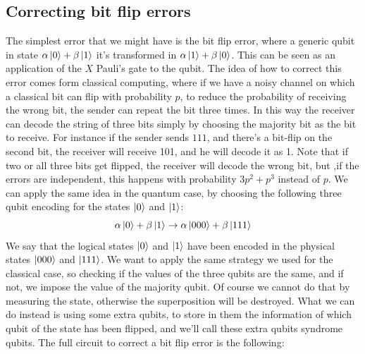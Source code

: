 \documentclass{article}
\begin{document}
	\subsection{Correcting bit flip errors}
	The simplest error that we might have is the bit flip error, where a generic qubit in state $\alpha\ket{0} + \beta\ket{1}$ it's transformed in $\alpha\ket{1} + \beta\ket{0}$. This can be seen as an application of the $X$ Pauli's gate to the qubit. The idea of how to correct this error comes form classical computing, where if we have a noisy channel on which a classical bit can flip with probability $p$, to reduce the probability of receiving the wrong bit, the sender can repeat the bit three times. In this way the receiver can decode the string of three bits simply by choosing the majority bit as the bit to receive. For instance if the sender sends $111$, and there's a bit-flip on the second bit, the receiver will receive 101, and he will decode it as 1. Note that if two or all three bits get flipped, the receiver will decode the wrong bit, but ,if the errors are independent, this happens with probability $3p^2 + p^3$ instead of $p$. We can apply the same idea in the quantum case, by choosing the following three qubit encoding for the states $\ket{0}$ and $\ket{1}$:
	\[ \alpha\ket{0} + \beta\ket{1} \rightarrow \alpha\ket{000} + \beta\ket{111}\]
	We say that the logical states $\ket{0}$ and $\ket{1}$ have been encoded in the physical states $\ket{000}$ and $\ket{111}$. We want to apply the same strategy we used for the classical case, so checking if the values of the three qubits are the same, and if not, we impose the value of the majority qubit. Of course we cannot do that by measuring the state, otherwise the superposition will be destroyed. What we can do instead is using some extra qubits, to store in them the information of which qubit of the state has been flipped, and we'll call these extra qubits syndrome qubits. The full circuit to correct a bit flip error is the following:
\end{document}
